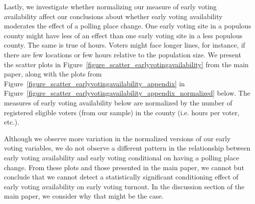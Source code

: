 \documentclass{cup_PSRM}
\begin{document}
Lastly, we investigate whether normalizing our measure of early voting availability affect our conclusions about whether early voting availability moderates the effect of a polling place change.  One early voting site in a populous county might have less of an effect than one early voting site in a less populous county.  The same is true of hours.  Voters might face longer lines, for instance, if there are few locations or few hours relative to the population size.  We present the scatter plots in Figure~\ref{figure_scatter_earlyvotingavailability} from the main paper, along with the plots from Figure~\ref{figure_scatter_earlyvotingavailability_appendix} in Figure~\ref{figure_scatter_earlyvotingavailability_appendix_normalized} below.  The measures of early voting availability below are normalized by the number of registered eligible voters (from our sample) in the county (i.e. hours per voter, etc.).

Although we observe more variation in the normalized versions of our early voting variables, we do not observe a different pattern in the relationship between early voting availability and early voting conditional on having a polling place change.  From these plots and those presented in the main paper, we cannot but conclude that we cannot detect a statistically significant conditioning effect of early voting availability on early voting turnout.  In the discussion section of the main paper, we consider why that might be the case.
\end{document}

